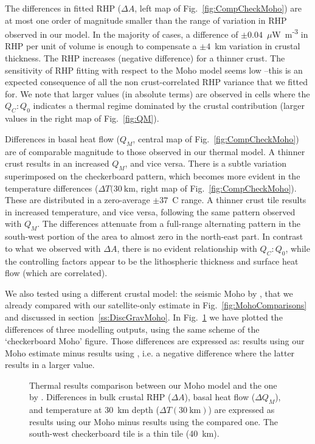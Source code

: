 {The differences in fitted RHP ($\Delta A$, left map of Fig.~\ref{fig:CompCheckMoho}) are at most one order of magnitude smaller than the range of variation in RHP observed in our model.
In the majority of cases, a difference of $\pm 0.04$~{$\mu$W~m\textsuperscript{-3}} in RHP per unit of volume is enough to compensate a $\pm 4$~km variation in crustal thickness.
The RHP increases (negative difference) for a thinner crust.
The sensitivity of RHP fitting with respect to the Moho model seems low --this is an expected consequence of all the non crust-correlated RHP variance that we fitted for.
We note that larger values (in absolute terms) are observed in cells where the $Q_C:Q_0$ indicates a thermal regime dominated by the crustal contribution (larger values in the right map of Fig.~\ref{fig:QM}).

Differences in basal heat flow ($Q_M$, central map of Fig.~\ref{fig:CompCheckMoho}) are of comparable magnitude to those observed in our thermal model.
A thinner crust results in an increased $Q_M$, and vice versa.
There is a subtle variation superimposed on the checkerboard pattern, which becomes more evident in the temperature differences ($\Delta T(30~\mathrm{km}$, right map of Fig.~\ref{fig:CompCheckMoho}).
These are distributed in a zero-average $\pm 37$~\textdegree C range.
A thinner crust tile results in increased temperature, and vice versa, following the same pattern observed with $Q_M$.
The differences attenuate from a full-range alternating pattern in the south-west portion of the area to almost zero in the north-east part.
In contrast to what we observed with $\Delta A$, there is no evident relationship with $Q_C:Q_0$, while the controlling factors appear to be the lithospheric thickness and surface heat flow (which are correlated).

We also tested using a different crustal model: the seismic Moho by \textcite{Grad2009}, that we already compared with our satellite-only estimate in Fig.~\ref{fig:MohoComparisons} and discussed in section~\ref{ss:DiscGravMoho}.
In Fig.~\ref{fig:CompGradMoho} we have plotted the differences of three modelling outputs, using the same scheme of the `checkerboard Moho' figure.
Those differences are expressed as: results using our Moho estimate minus results using \textcite{Grad2009}, i.e. a negative difference where the latter results in a larger value.

\begin{figure}
	\begin{adjustbox}{center}
	\end{adjustbox}
	\caption{Thermal results comparison between our Moho model and the one by \textcite{Grad2009}. Differences in bulk crustal RHP ($\Delta A$), basal heat flow ($\Delta Q_M$), and temperature at 30~km depth ($\Delta T(30~\mathrm{km})$) are expressed as results using our Moho minus results using the compared one. The south-west checkerboard tile is a thin tile (40~km).}
	\label{fig:CompGradMoho}
\end{figure}

}
